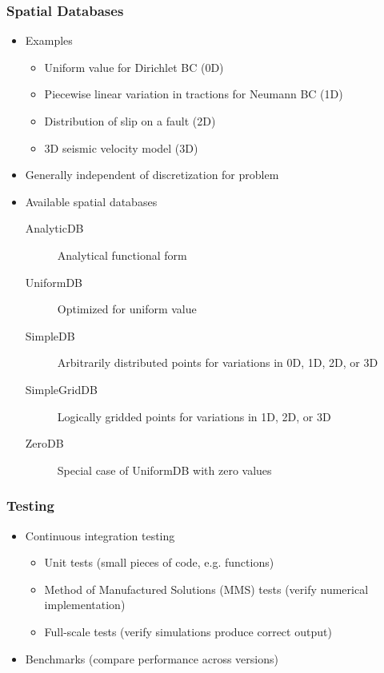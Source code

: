 \documentclass[aspectratio=169]{beamer}
\begin{document}
\begin{frame}
  \frametitle{Spatial Databases}

  \begin{itemize}
 \item Examples
    \begin{itemize}
    \item Uniform value for Dirichlet BC (0D)
    \item Piecewise linear variation in tractions for Neumann BC (1D)
    \item Distribution of slip on a fault (2D)
    \item 3D seismic velocity model (3D)
    \end{itemize}\pause
  \item Generally independent of discretization for problem\pause
  \item Available spatial databases
    \begin{description}
    \item[AnalyticDB] Analytical functional form
    \item[UniformDB] Optimized for uniform value
    \item[SimpleDB] Arbitrarily distributed points for variations in 0D, 1D, 2D, or 3D
    \item[SimpleGridDB] Logically gridded points for variations in 1D, 2D, or 3D
    \item[ZeroDB] Special case of UniformDB with zero values
    \end{description}
 \end{itemize}

\end{frame}


\begin{frame}
  \frametitle{Testing}

  \begin{itemize}
    \item Continuous integration testing
    \begin{itemize}
      \item Unit tests (small pieces of code, e.g. functions)
      \item Method of Manufactured Solutions (MMS) tests (verify numerical implementation)
      \item Full-scale tests (verify simulations produce correct output)
    \end{itemize}
    \item Benchmarks (compare performance across versions)
    \end{itemize}

\end{frame}
\end{document}
